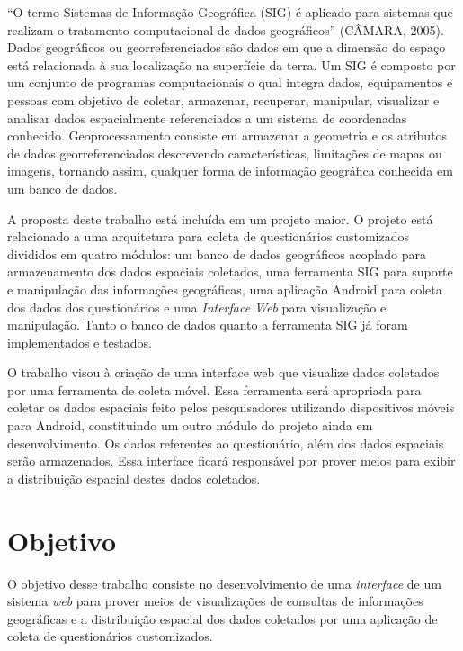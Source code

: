 \documentclass[
	12pt,				%
    oneside,			%
	a4paper,			%
	english,			%
	french,				%
	spanish,			%
	brazil,				%
	]{abntex2}
\begin{document}
“O termo Sistemas de Informação Geográfica (SIG) é aplicado para sistemas que realizam o tratamento computacional de dados geográficos” (CÂMARA, 2005). Dados geográficos ou georreferenciados são dados em que a dimensão do espaço está relacionada à sua localização na superfície da terra. Um SIG é composto por um conjunto de programas computacionais o qual integra dados, equipamentos e pessoas com objetivo de coletar, armazenar, recuperar, manipular, visualizar e analisar dados espacialmente referenciados a um sistema de coordenadas conhecido. 
Geoprocessamento consiste em armazenar a geometria e os atributos de dados georreferenciados descrevendo características, limitações de mapas ou imagens, tornando assim, qualquer forma de informação geográfica conhecida em um banco de dados.

A proposta deste trabalho está incluída em um projeto maior. O projeto está relacionado a uma arquitetura para coleta de questionários customizados divididos em quatro módulos: um banco de dados geográficos acoplado para armazenamento dos dados espaciais coletados, uma ferramenta SIG para suporte e manipulação das informações geográficas, uma aplicação Android para coleta dos dados dos questionários e uma \textit{Interface Web} para visualização e manipulação. Tanto o banco de dados quanto a ferramenta SIG já foram implementados e testados.

O trabalho visou à criação de uma interface web que visualize dados coletados por uma ferramenta de coleta móvel. Essa ferramenta será apropriada para coletar os dados espaciais feito pelos pesquisadores utilizando dispositivos móveis para Android, constituindo um outro módulo do projeto ainda em desenvolvimento. Os dados referentes ao questionário, além dos dados espaciais serão armazenados. Essa interface ficará responsável por prover meios para exibir a distribuição espacial destes dados coletados.


\section{Objetivo}
O objetivo desse trabalho consiste no desenvolvimento de uma \textit{interface} de um sistema \textit{web} para prover meios de visualizações de consultas de informações geográficas e a distribuição espacial dos dados coletados por uma aplicação de coleta de questionários customizados.
\end{document}
